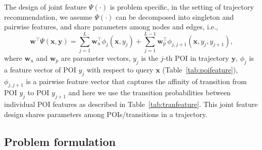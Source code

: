 \documentclass[9pt]{extarticle}
\begin{document}
The design of joint feature $\Psi(\cdot)$ is problem specific, 
in the setting of trajectory recommendation, we assume $\Psi(\cdot)$ can be decomposed into singleton and pairwise features, 
and share parameters among nodes and edges, i.e.,
\begin{equation}
\label{eq:jointfeature}
\mathbf{w}^\top \Psi(\mathbf{x}, \mathbf{y}) = \sum_{j=1}^L \mathbf{w}_u^\top \phi_j(\mathbf{x}, y_j) +
                                               \sum_{j=1}^{L-1} \mathbf{w}_p^\top \phi_{j, j+1}(\mathbf{x}, y_j, y_{j+1}),
\end{equation}
where $\mathbf{w}_u$ and $\mathbf{w}_p$ are parameter vectors,
$y_j$ is the $j$-th POI in trajectory $\mathbf{y}$, 
$\phi_j$ is a feature vector of POI $y_j$ with respect to query $\mathbf{x}$ (Table~\ref{tab:poifeature}),
$\phi_{j,j+1}$ is a pairwise feature vector that captures the affinity of transition from POI $y_j$ to POI $y_{j+1}$ and
here we use the transition probabilities between individual POI features as described in Table~\ref{tab:tranfeature}.
This joint feature design shares parameters among POIs/transitions in a trajectory.


\subsection{Problem formulation}
\label{sec:trajform}
\end{document}
